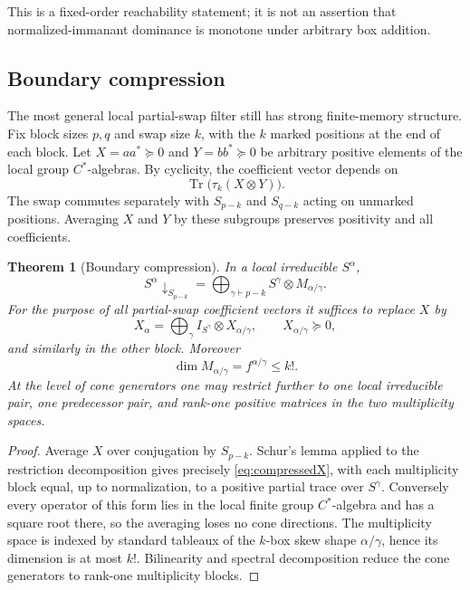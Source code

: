 \documentclass[11pt]{article}
\newtheorem{theorem}{Theorem}[section]
\theoremstyle{definition}
\newcommand{\Tr}{\operatorname{Tr}}
\begin{document}
This is a fixed-order reachability statement; it is not an assertion that normalized-immanant dominance is monotone under arbitrary box addition.

\subsection{Boundary compression}
The most general local partial-swap filter still has strong finite-memory structure.  Fix block sizes $p,q$ and swap size $k$, with the $k$ marked positions at the end of each block.  Let $X=aa^*\succeq0$ and $Y=bb^*\succeq0$ be arbitrary positive elements of the local group $C^*$-algebras.  By cyclicity, the coefficient vector depends on
\[
 \Tr\bigl(\tau_k(X\otimes Y)\bigr).
\]
The swap commutes separately with $S_{p-k}$ and $S_{q-k}$ acting on unmarked positions.  Averaging $X$ and $Y$ by these subgroups preserves positivity and all coefficients.

\begin{theorem}[Boundary compression]\label{thm:compression}
In a local irreducible $S^\alpha$,
\[
 S^\alpha\downarrow_{S_{p-k}}
 =\bigoplus_{\gamma\vdash p-k}S^\gamma\otimes M_{\alpha/\gamma}.
\]
For the purpose of all partial-swap coefficient vectors it suffices to replace $X$ by
\begin{equation}\label{eq:compressedX}
 X_\alpha=\bigoplus_\gamma I_{S^\gamma}\otimes X_{\alpha/\gamma},
 \qquad X_{\alpha/\gamma}\succeq0,
\end{equation}
and similarly in the other block.  Moreover
\[
 \dim M_{\alpha/\gamma}=f^{\alpha/\gamma}\le k!.
\]
At the level of cone generators one may restrict further to one local irreducible pair, one predecessor pair, and rank-one positive matrices in the two multiplicity spaces.
\end{theorem}

\begin{proof}
Average $X$ over conjugation by $S_{p-k}$.  Schur's lemma applied to the restriction decomposition gives precisely \eqref{eq:compressedX}, with each multiplicity block equal, up to normalization, to a positive partial trace over $S^\gamma$.  Conversely every operator of this form lies in the local finite group $C^*$-algebra and has a square root there, so the averaging loses no cone directions.  The multiplicity space is indexed by standard tableaux of the $k$-box skew shape $\alpha/\gamma$, hence its dimension is at most $k!$.  Bilinearity and spectral decomposition reduce the cone generators to rank-one multiplicity blocks.
\end{proof}
\end{document}
